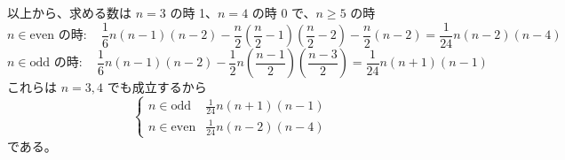 \documentclass[../main.tex]{subfiles}
\begin{document}
\begin{enumerate}
\begin{enumerate}
        \begin{center}
        \end{center}
    \end{enumerate}

    以上から、求める数は $n=3$ の時 1、$n=4$ の時 0 で、$n \ge 5$ の時
    \[
      n \in \text{even の時}: \quad \frac{1}{6}n(n-1)(n-2) - \frac{n}{2}\left(\frac{n}{2}-1\right)\left(\frac{n}{2}-2\right) - \frac{n}{2}(n-2) = \frac{1}{24}n(n-2)(n-4)
    \]
    \[
      n \in \text{odd の時}: \quad \frac{1}{6}n(n-1)(n-2) - \frac{1}{2}n\left(\frac{n-1}{2}\right)\left(\frac{n-3}{2}\right) = \frac{1}{24}n(n+1)(n-1)
    \]
    これらは $n=3, 4$ でも成立するから
    \[
      \begin{cases}
        n \in \text{odd} & \frac{1}{24}n(n+1)(n-1) \\
        n \in \text{even} & \frac{1}{24}n(n-2)(n-4)
      \end{cases}
    \]
    である。
\end{enumerate}
\end{document}
